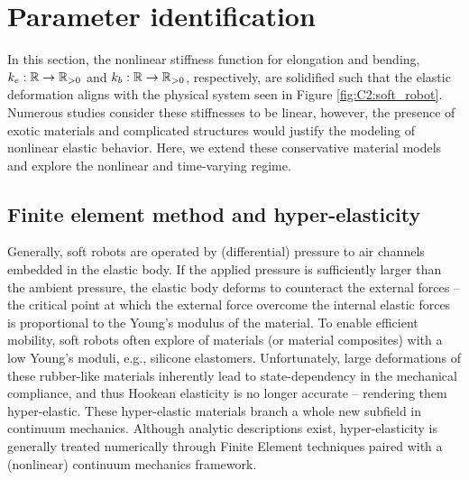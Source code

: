 \section{Parameter identification}
\label{sec: chap2 section header}
\noindent In this section, the nonlinear stiffness function for elongation and bending, $k_e: \mathbb{R} \to \mathbb{R}_{>0}$ and $k_b: \mathbb{R} \to \mathbb{R}_{>0}$, respectively, are solidified such that the elastic deformation aligns with the physical system seen in Figure \ref{fig:C2:soft_robot}. Numerous studies consider these stiffnesses to be linear, however, the presence of exotic materials and complicated structures would justify the modeling of nonlinear elastic behavior. Here, we extend these conservative material models and explore the nonlinear and time-varying regime.

\subsection{Finite element method and hyper-elasticity}
Generally, soft robots are operated by (differential) pressure to air channels embedded in the elastic body. If the applied pressure is sufficiently larger than the ambient pressure, the elastic body deforms to counteract the external forces -- the critical point at which the external force overcome the internal elastic forces is proportional to the Young's modulus of the material. To enable efficient mobility, soft robots often explore of materials (or material composites) with a low Young's moduli, e.g., silicone elastomers. Unfortunately, large deformations of these rubber-like materials inherently lead to state-dependency in the mechanical compliance, and thus Hookean elasticity is no longer accurate -- rendering them hyper-elastic. These hyper-elastic materials branch a whole new subfield in continuum mechanics. Although analytic descriptions exist, hyper-elasticity is generally treated numerically through Finite Element techniques \cite{Duriez2013,Largilliere2015,Coevoet2017} paired with a (nonlinear) continuum mechanics framework.

